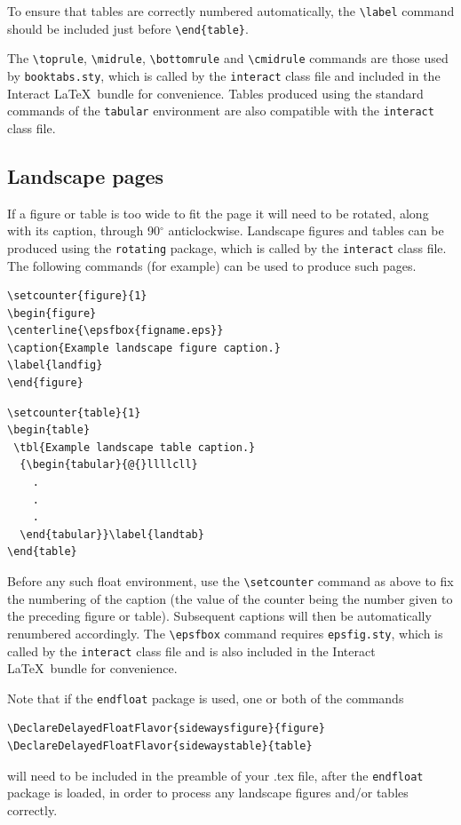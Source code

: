 \documentclass[]{interact}
\theoremstyle{plain}%
\theoremstyle{definition}
\theoremstyle{remark}
\begin{document}
To ensure that tables are correctly numbered automatically, the \verb"\label" command should be included just before \verb"\end{table}".

The \verb"\toprule", \verb"\midrule", \verb"\bottomrule" and \verb"\cmidrule" commands are those used by \verb"booktabs.sty", which is called by the \texttt{interact} class file and included in the \textsf{Interact} \LaTeX\ bundle for convenience. Tables produced using the standard commands of the \texttt{tabular} environment are also compatible with the \texttt{interact} class file.


\subsection{Landscape pages}

If a figure or table is too wide to fit the page it will need to be rotated, along with its caption, through 90$^{\circ}$ anticlockwise. Landscape figures and tables can be produced using the \verb"rotating" package, which is called by the \texttt{interact} class file. The following commands (for example) can be used to produce such pages.
\begin{verbatim}
\setcounter{figure}{1}
\begin{figure}
\centerline{\epsfbox{figname.eps}}
\caption{Example landscape figure caption.}
\label{landfig}
\end{figure}
\end{verbatim}
\begin{verbatim}
\setcounter{table}{1}
\begin{table}
 \tbl{Example landscape table caption.}
  {\begin{tabular}{@{}llllcll}
    .
    .
    .
  \end{tabular}}\label{landtab}
\end{table}
\end{verbatim}
Before any such float environment, use the \verb"\setcounter" command as above to fix the numbering of the caption (the value of the counter being the number given to the preceding figure or table). Subsequent captions will then be automatically renumbered accordingly. The \verb"\epsfbox" command requires \verb"epsfig.sty", which is called by the \texttt{interact} class file and is also included in the \textsf{Interact} \LaTeX\ bundle for convenience.

Note that if the \verb"endfloat" package is used, one or both of the commands
\begin{verbatim}
\DeclareDelayedFloatFlavor{sidewaysfigure}{figure}
\DeclareDelayedFloatFlavor{sidewaystable}{table}
\end{verbatim}
will need to be included in the preamble of your .tex file, after the \verb"endfloat" package is loaded, in order to process any landscape figures and/or tables correctly.
\end{document}
